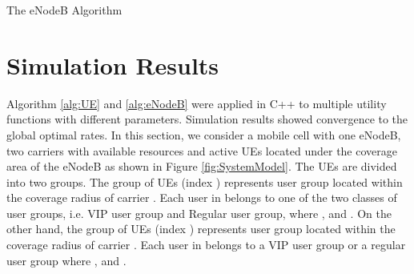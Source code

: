 \documentclass[journal]{IEEEtran} 				\IEEEoverridecommandlockouts 						\usepackage{amsmath,amssymb}
\begin{document}
\begin{algorithm}
\caption{The eNodeB Algorithm}\label{alg:eNodeB}
\begin{algorithmic}
\LOOP
{}
\ENDFOR
{}
\ENDFOR
{}
 \IF{}
 \STATE{}
 \ELSE
 \STATE{}
 \ENDIF
 \IF{}
 \STATE{}
\STATE{}
 \IF{}
 \STATE{}
 \ELSE
 \STATE{}
 \ENDIF
 \ENDIF
\ENDFOR
{}
\ENDLOOP
\end{algorithmic}
\end{algorithm}

\section{Simulation Results}\label{sec:sim}
Algorithm \ref{alg:UE} and \ref{alg:eNodeB} were applied in C++ to multiple utility functions with different parameters. Simulation results showed convergence to the global optimal rates. In this section, we consider a mobile cell with one eNodeB, two carriers with available resources and  active UEs located under the coverage area of the eNodeB as shown in Figure \ref{fig:SystemModel}. The UEs are divided into two groups. The  group of UEs (index ) represents user group  located within the coverage radius  of carrier . Each user in  belongs to one of the two classes of user groups, i.e. VIP user group and Regular user group, where ,  and . On the other hand, the  group of UEs (index ) represents user group  located within the coverage radius  of carrier . Each user in  belongs to a VIP user group or a regular user group where ,  and .
\end{document}
